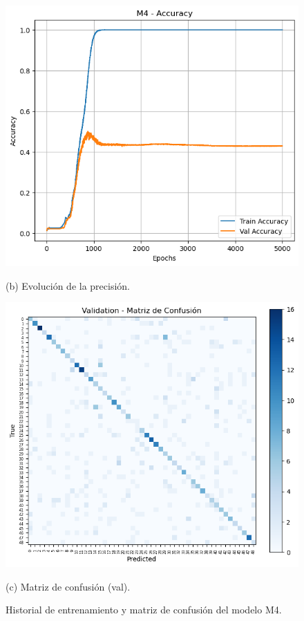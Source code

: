 \documentclass[11pt]{article}
\begin{document}
\begin{figure}[H]
\begin{minipage}[t]{0.32\textwidth}
        \includegraphics[width=\linewidth]{figures/acc_m4.png}
        \caption*{(b) Evolución de la precisión.}
    \end{minipage}
    \hfill
    \begin{minipage}[t]{0.32\textwidth}
        \centering
        \includegraphics[width=\linewidth]{figures/conf_matrix_m4.png}
        \caption*{(c) Matriz de confusión (val).}
    \end{minipage}
    \caption{Historial de entrenamiento y matriz de confusión del modelo M4.}
    \label{fig:plots-m4}
\end{figure}
\end{document}
